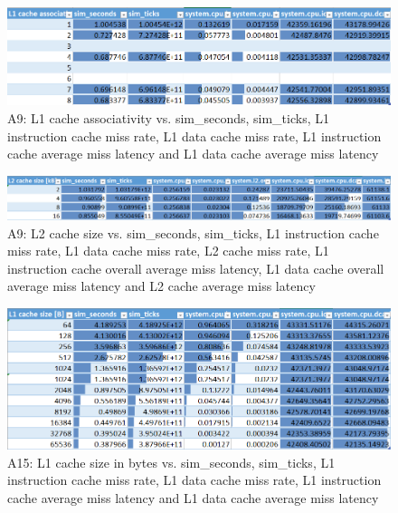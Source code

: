 \documentclass[a4paper, 10pt, conference]{ieeeconf}      %
\begin{document}
\begin{figure}[thpb]
\centering
\includegraphics[scale=0.7]{Figures/assignment1_2_table.png}
\caption{A9: L1 cache associativity vs. sim\_seconds, sim\_ticks, L1 instruction cache miss rate, L1 data cache miss rate, L1 instruction cache average miss latency and L1 data cache average miss latency}
\label{Afigure1_2}
\end{figure}

\begin{figure}[thpb]
\centering
\includegraphics[scale=0.572]{Figures/assignment1_3_table.png}
\caption{A9: L2 cache size vs. sim\_seconds, sim\_ticks, L1 instruction cache miss rate, L1 data cache miss rate, L2 cache miss rate, L1 instruction cache overall average miss latency, L1 data cache overall average miss latency and L2 cache average miss latency}
\label{Afigure1_3}
\end{figure}

\begin{figure}[thpb]
\centering
\includegraphics[scale=0.7]{Figures/assignment2_2_table.png}
\caption{A15: L1 cache size in bytes vs. sim\_seconds, sim\_ticks, L1 instruction cache miss rate, L1 data cache miss rate, L1 instruction cache average miss latency and L1 data cache average miss latency}
\label{Afigure2_2}
\end{figure}
\end{document}

